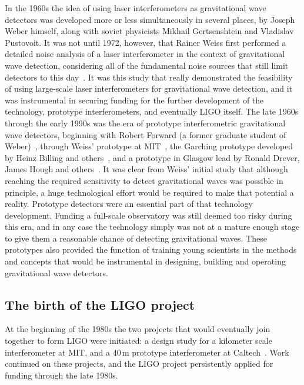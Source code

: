 In the 1960s the idea of using laser interferometers as gravitational wave detectors was developed more or less simultaneously 
in several places, by Joseph Weber himself, along with soviet physicists Mikhail Gertsenshtein and Vladislav Pustovoit. 
It was not until 1972, however, that Rainer Weiss first performed a detailed noise analysis of a laser interferometer in the context 
of gravitational wave detection, considering all of the fundamental noise sources that still limit detectors to this day~\cite{Weiss1972}. 
It was this study that really demonstrated the feasibility of using large-scale laser interferometers for gravitational wave detection, and 
it was instrumental in securing funding for the further development of the technology, prototype interferometers, and eventually LIGO itself. 
The late 1960s through the early 1990s was the era of prototype interferometric gravitational wave detectors, beginning with 
Robert Forward (a former graduate student of Weber)~\cite{Forward_1978}, through Weiss' prototype at MIT~\cite{Dewey_1984}, the Garching prototype developed by 
Heinz Billing and others~\cite{Shoemaker1988}, and a prototype in Glasgow lead by Ronald Drever, James Hough and others~\cite{Robertson_1995}. 
It was clear from Weiss' initial study that although reaching the required sensitivity to detect gravitational waves 
was possible in principle, a huge technological effort would 
be required to make that potential a reality. 
Prototype detectors were an essential part of that technology development. Funding a full-scale 
observatory was still deemed too risky during this era, and in any case the technology simply was not at a mature enough stage to give them 
a reasonable chance of detecting gravitational waves. These prototypes also provided the function 
of training young scientists in the methods and concepts that would be instrumental in 
designing, building and operating gravitational wave detectors. 

\subsection{The birth of the LIGO project}
At the beginning of the 1980s the two projects that would eventually join together to form LIGO were initiated: 
a design study for a kilometer scale interferometer at MIT, and a 40\,m 
prototype interferometer at Caltech~\cite{Spero_1989}. Work continued on these projects, and the LIGO project persistently applied for funding through the late 1980s.

